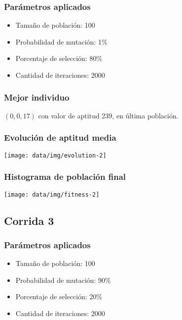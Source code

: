 \documentclass[a4paper,12pt]{article}
\begin{document}
\subsubsection*{Parámetros aplicados}

\begin{multicols}{2}
\begin{itemize}
	\item Tamaño de población: 100
	\item Probabilidad de mutación: 1\%
	\item Porcentaje de selección: 80\%
	\item Cantidad de iteraciones: 2000
\end{itemize}
\end{multicols}

\subsubsection*{Mejor individuo}

$(0, 0, 17)$ con valor de aptitud 239, en última población.

\subsubsection*{Evolución de aptitud media}

\texttt{[image: data/img/evolution-2]}

\subsubsection*{Histograma de población final}

\texttt{[image: data/img/fitness-2]}

\subsection{Corrida 3}

\subsubsection*{Parámetros aplicados}

\begin{multicols}{2}
\begin{itemize}
	\item Tamaño de población: 100
	\item Probabilidad de mutación: 90\%
	\item Porcentaje de selección: 20\%
	\item Cantidad de iteraciones: 2000
\end{itemize}
\end{multicols}
\end{document}
